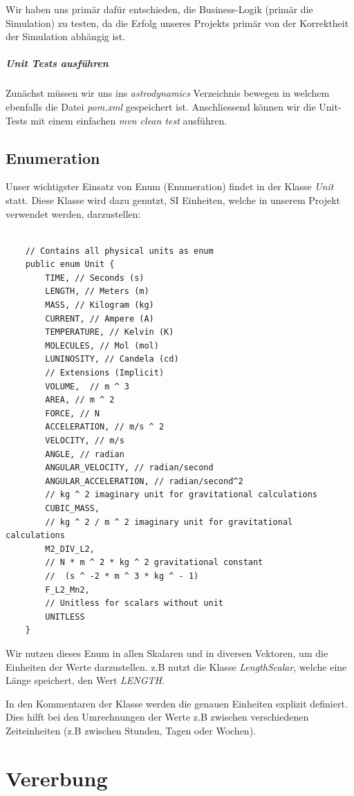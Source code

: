 Wir haben uns primär dafür entschieden, die Business-Logik (primär die Simulation) zu testen, da die Erfolg unseres Projekts primär von der Korrektheit der Simulation abhängig ist.

\subparagraph{Unit Tests ausführen}

Zunächst müssen wir uns ins \textit{astrodynamics} Verzeichnis bewegen in welchem ebenfalls die Datei \textit{pom.xml} gespeichert ist.
Anschliessend können wir die Unit-Tests mit einem einfachen \textit{mvn clean test} ausführen.

\subsection{Enumeration}

Unser wichtigster Einsatz von Enum (Enumeration) findet in der Klasse \textit{Unit} statt. Diese Klasse wird dazu genutzt, SI Einheiten, welche in unserem Projekt verwendet werden, darzustellen:

\begin{lstlisting}
	
	// Contains all physical units as enum
	public enum Unit {
		TIME, // Seconds (s)
		LENGTH, // Meters (m)
		MASS, // Kilogram (kg)
		CURRENT, // Ampere (A)
		TEMPERATURE, // Kelvin (K)
		MOLECULES, // Mol (mol)
		LUNINOSITY, // Candela (cd)
		// Extensions (Implicit)
		VOLUME,  // m ^ 3
		AREA, // m ^ 2
		FORCE, // N
		ACCELERATION, // m/s ^ 2
		VELOCITY, // m/s
		ANGLE, // radian
		ANGULAR_VELOCITY, // radian/second
		ANGULAR_ACCELERATION, // radian/second^2
		// kg ^ 2 imaginary unit for gravitational calculations
		CUBIC_MASS, 
		// kg ^ 2 / m ^ 2 imaginary unit for gravitational calculations
		M2_DIV_L2,
		// N * m ^ 2 * kg ^ 2 gravitational constant
		//  (s ^ -2 * m ^ 3 * kg ^ - 1) 
		F_L2_Mn2,
		// Unitless for scalars without unit
		UNITLESS
	}

\end{lstlisting}

Wir nutzen dieses Enum in allen Skalaren und in diversen Vektoren, um die Einheiten der Werte darzustellen. z.B nutzt die Klasse \textit{LengthScalar}, welche eine Länge speichert, den Wert \textit{LENGTH}.

In den Kommentaren der Klasse werden die genauen Einheiten explizit definiert. Dies hilft bei den Umrechnungen der Werte z.B zwischen verschiedenen Zeiteinheiten (z.B zwischen Stunden, Tagen oder Wochen).

\section{Vererbung}


